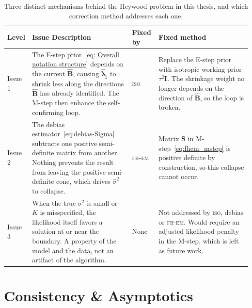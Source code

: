\begin{table}[htbp]
\centering
\begin{tabular}{p{1.6cm}p{6.3cm}p{1.6cm}p{4.3cm}}
\toprule
Level & Issue Description & Fixed by & Fixed method \\
\midrule
Issue 1 & 
The E-step prior~\eqref{eq: Overall notation structure} depends on the current $\hat{\mathbf{B}}$, causing $\hat{\bm{\lambda}}_j$ to shrink less along the directions $\hat{\mathbf{B}}$ has already identified. The M-step then enhance the self-confirming loop. &
\textsc{iso} &
Replace the E-step prior with isotropic working prior $\tau^2\mathbf{I}$. The shrinkage weight no longer depends on the direction of $\hat{\mathbf{B}}$, so the loop is broken. \\
\addlinespace
Issue 2 &
The debias estimator~\eqref{eq:debias-Sigma} subtracts one positive semi-definite matrix from another. Nothing prevents the result from leaving the positive semi-definite cone, which drives $\hat\sigma^2$ to collapse. &
\textsc{fh-em} &
Matrix $\mathbf{S}$ in M-step~\eqref{eq:fhem_mstep} is positive definite by construction, so this collapse cannot occur. \\
\addlinespace
Issue 3 &
When the true $\sigma^2$ is small or $K$ is misspecified, the likelihood itself favors a solution at or near the boundary. A property of the model and the data, not an artifact of the algorithm. &
None &
Not addressed by \textsc{iso}, debias or \textsc{fh-em}. Would require an adjusted likelihood penalty in the M-step, which is left as future work. \\
\bottomrule
\end{tabular}
\caption{Three distinct mechanisms behind the Heywood problem in this thesis, and which correction method addresses each one.}
\label{tab:heywood-levels}
\end{table}
\fi

\section{Consistency \& Asymptotics}
\label{sec:asymptotical-properties}